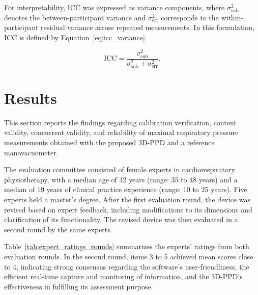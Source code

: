 \documentclass{ieeeaccess}
\begin{document}
For interpretability, ICC was expressed as variance components, where \ensuremath{\sigma^2_{\mathrm{sub}}} denotes the between-participant variance and \ensuremath{\sigma^2_{\mathrm{err}}} corresponds to the within-participant residual variance across repeated measurements. In this formulation, ICC is defined by Equation~\eqref{eq:icc_variance}.

\begin{equation}
  \mathrm{ICC} = \frac{\sigma^2_{\mathrm{sub}}}{\sigma^2_{\mathrm{sub}} + \sigma^2_{\mathrm{err}}}.
  \label{eq:icc_variance}
\end{equation}

\section{Results}
\label{sec:experimental_results}

This section reports the findings regarding calibration verification, content validity, concurrent validity, and reliability of maximal respiratory pressure measurements obtained with the proposed 3D-PPD and a reference manovacuometer.

The evaluation committee consisted of female experts in cardiorespiratory physiotherapy, with a median age of 42 years (range: 35 to 48 years) and a median of 19 years of clinical practice experience (range: 10 to 25 years). Five experts held a master's degree. After the first evaluation round, the device was revised based on expert feedback, including modifications to its dimensions and clarification of its functionality. The revised device was then evaluated in a second round by the same experts.

Table~\ref{tab:expert_ratings_rounds} summarizes the experts' ratings from both evaluation rounds. In the second round, items 3 to 5 achieved mean scores close to 4, indicating strong consensus regarding the software's user-friendliness, the efficient real-time capture and monitoring of information, and the 3D-PPD's effectiveness in fulfilling its assessment purpose.
\end{document}

